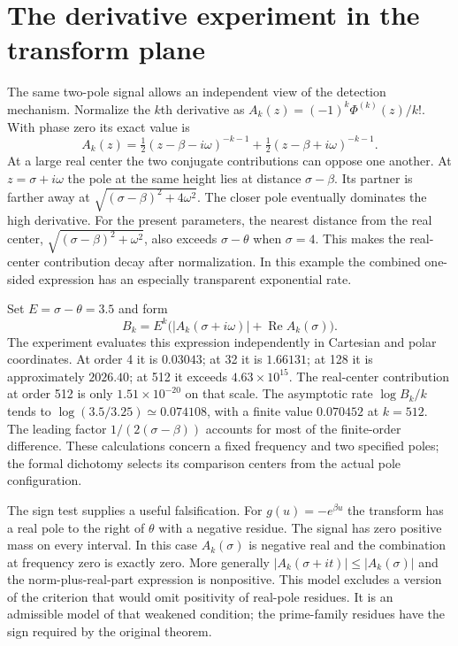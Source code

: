 \documentclass[12pt,letterpaper]{article}
\begin{document}
\section{The derivative experiment in the transform plane}
The same two-pole signal allows an independent view of the detection mechanism. Normalize the \(k\)th derivative as \(A_k(z)=(-1)^k\Phi^{(k)}(z)/k!\). With phase zero its exact value is
\[
 A_k(z)=\tfrac12(z-\beta-i\omega)^{-k-1}
             +\tfrac12(z-\beta+i\omega)^{-k-1}.
\]
At a large real center the two conjugate contributions can oppose one another. At \(z=\sigma+i\omega\) the pole at the same height lies at distance \(\sigma-\beta\). Its partner is farther away at \(\sqrt{(\sigma-\beta)^2+4\omega^2}\). The closer pole eventually dominates the high derivative. For the present parameters, the nearest distance from the real center, \(\sqrt{(\sigma-\beta)^2+\omega^2}\), also exceeds \(\sigma-\theta\) when \(\sigma=4\). This makes the real-center contribution decay after normalization. In this example the combined one-sided expression has an especially transparent exponential rate.

Set \(E=\sigma-\theta=3.5\) and form
\[
       B_k=E^k\bigl(|A_k(\sigma+i\omega)|+\operatorname{Re}A_k(\sigma)\bigr).
\]
The experiment evaluates this expression independently in Cartesian and polar coordinates. At order 4 it is \(0.03043\); at 32 it is \(1.66131\); at 128 it is approximately \(2026.40\); at 512 it exceeds \(4.63\times10^{15}\). The real-center contribution at order 512 is only \(1.51\times10^{-20}\) on that scale. The asymptotic rate \(\log B_k/k\) tends to \(\log(3.5/3.25)\simeq0.074108\), with a finite value \(0.070452\) at \(k=512\). The leading factor \(1/(2(\sigma-\beta))\) accounts for most of the finite-order difference. These calculations concern a fixed frequency and two specified poles; the formal dichotomy selects its comparison centers from the actual pole configuration.

The sign test supplies a useful falsification. For \(g(u)=-e^{\beta u}\) the transform has a real pole to the right of \(\theta\) with a negative residue. The signal has zero positive mass on every interval. In this case \(A_k(\sigma)\) is negative real and the combination at frequency zero is exactly zero. More generally \(|A_k(\sigma+it)|\le |A_k(\sigma)|\) and the norm-plus-real-part expression is nonpositive. This model excludes a version of the criterion that would omit positivity of real-pole residues. It is an admissible model of that weakened condition; the prime-family residues have the sign required by the original theorem.
\end{document}
